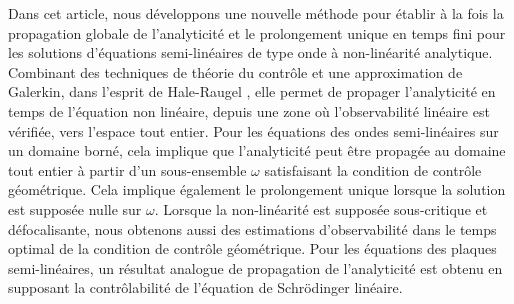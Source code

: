 \documentclass[JEP,XML,SOM,Unicode,published]{cedram}
\theoremstyle{definition}
\begin{document}




\begin{altabstract}
Dans cet article, nous développons une nouvelle méthode pour établir à la fois la propagation globale de l'analyticité et le prolongement unique en temps fini pour les solutions d'équations semi-linéaires de type onde à non-linéarité analytique. Combinant des techniques de théorie du contrôle et une approximation de Galerkin, dans l'esprit de Hale-Raugel \cite{HR03}, elle permet de propager l'analyticité en temps de l'équation non linéaire, depuis une zone où l'observabilité linéaire est vérifiée, vers l'espace tout entier. Pour les équations des ondes semi-linéaires sur un domaine borné, cela implique que l'analyticité peut être propagée au domaine tout entier à partir d'un sous-ensemble $\omega$ satisfaisant la condition de contrôle géométrique. Cela implique également le prolongement unique lorsque la solution est supposée nulle sur $\omega$. Lorsque la non-linéarité est supposée sous-critique et défocalisante, nous obtenons aussi des estimations d'observabilité dans le temps optimal de la condition de contrôle géométrique. Pour les équations des plaques semi-linéaires, un résultat analogue de propagation de l'analyticité est obtenu en supposant la contrôlabilité de l'équation de Schrödinger linéaire.
\end{altabstract}

\maketitle
\vspace*{-\baselineskip}
\tableofcontents

\mainmatter
\end{document}
